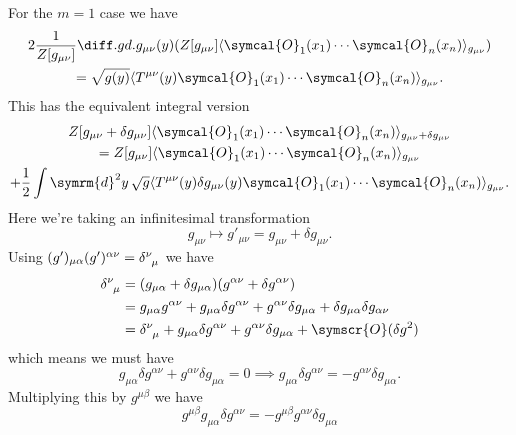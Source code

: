 \documentclass[fleqn]{NotesClass}
\renewcommand{\dl}[1]{\symrm{d}#1}
\newcommand{\quantumField}[1]{\symcal{#1}}
\DeclarePairedDelimiter{\correlator}{\langle}{\rangle}
\newcommand{\order}{\symscr{O}}
\begin{document}
    For the \(m = 1\) case we have
    \begin{multline}
        2 \frac{1}{Z[g_{\mu\nu}]} \diffd{}{g_{\mu\nu}(y)} (Z[g_{\mu\nu}] \correlator{\quantumField{O}_1(x_1) \dotsm \quantumField{O}_n(x_n)}_{g_{\mu\nu}})\\
        = \sqrt{g(y)} \correlator{T^{\mu\nu}(y) \quantumField{O}_1(x_1) \dotsm \quantumField{O}_n(x_n)}_{g_{\mu\nu}}.
    \end{multline}
    This has the equivalent integral version
    \begin{multline*}
        Z[g_{\mu\nu} + \delta g_{\mu\nu}] \correlator{\quantumField{O}_1(x_1) \dotsm \quantumField{O}_n(x_n)}_{g_{\mu\nu} + \delta g_{\mu\nu}}\\
        = Z[g_{\mu\nu}] \correlator{\quantumField{O}_1(x_1) \dotsm \quantumField{O}_n(x_n)}_{g_{\mu\nu}}\\
        + \frac{1}{2} \int \dl{^2y} \, \sqrt{g} \correlator{T^{\mu\nu}(y) \delta g_{\mu\nu}(y) \quantumField{O}_1(x_1) \dotsm \quantumField{O}_n(x_n)}_{g_{\mu\nu}}.
    \end{multline*}
    Here we're taking an infinitesimal transformation
    \begin{equation}
        g_{\mu\nu} \mapsto g'_{\mu\nu} = g_{\mu\nu} + \delta g_{\mu\nu}.
    \end{equation}
    Using \((g')_{\mu\alpha}(g')^{\alpha\nu} = \tensor{\delta}{^\nu_\mu}\) we have
    \begin{align}
        \tensor{\delta}{^\nu_\mu} &= (g_{\mu\alpha} + \delta g_{\mu\alpha})(g^{\alpha\nu} + \delta g^{\alpha\nu})\\
        &= g_{\mu\alpha} g^{\alpha\nu} + g_{\mu\alpha} \delta g^{\alpha\nu} + g^{\alpha\nu} \delta g_{\mu\alpha} + \delta g_{\mu\alpha} \delta g_{\alpha\nu}\\
        &= \tensor{\delta}{^\nu_\mu} + g_{\mu\alpha} \delta g^{\alpha\nu} + g^{\alpha\nu} \delta g_{\mu\alpha} + \order(\delta g^2)
    \end{align}
    which means we must have
    \begin{equation}
        g_{\mu\alpha} \delta g^{\alpha\nu} + g^{\alpha\nu} \delta g_{\mu\alpha} = 0 \implies g_{\mu\alpha} \delta g^{\alpha\nu} = -g^{\alpha\nu} \delta g_{\mu\alpha}.
    \end{equation}
    Multiplying this by \(g^{\mu\beta}\) we have
    \begin{equation}
        g^{\mu\beta} g_{\mu\alpha} \delta g^{\alpha\nu} = - g^{\mu\beta} g^{\alpha\nu} \delta g_{\mu\alpha}
    \end{equation}
\end{document}

